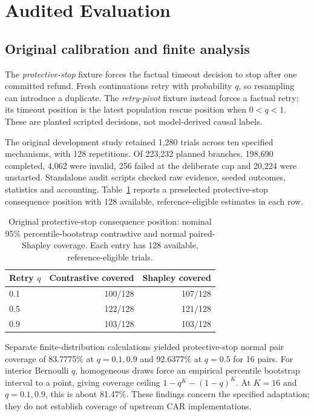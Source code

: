 \documentclass[conference]{IEEEtran}
\begin{document}
\section{Audited Evaluation}
\subsection{Original calibration and finite analysis}
The \emph{protective-stop} fixture forces the factual timeout decision to stop
after one committed refund. Fresh continuations retry with probability $q$,
so resampling can introduce a duplicate. The \emph{retry-pivot} fixture instead
forces a factual retry; its timeout position is the latest population rescue
position when $0<q<1$. These are planted scripted decisions, not model-derived
causal labels.

The original development study retained 1,280 trials across ten specified
mechanisms, with 128 repetitions. Of 223,232 planned branches, 198,690
completed, 4,062 were invalid, 256 failed at the deliberate cap and 20,224
were unstarted. Standalone audit scripts checked raw evidence, seeded outcomes,
statistics and accounting. Table~\ref{tab:original} reports a preselected
protective-stop consequence position with 128 available, reference-eligible
estimates in each row.

\begin{table}[t]
\caption{Original protective-stop consequence position: nominal 95\%
percentile-bootstrap contrastive and normal paired-Shapley coverage.
Each entry has 128 available, reference-eligible trials.}
\label{tab:original}
\centering
\begin{tabular}{lrr}
\toprule
Retry $q$ & Contrastive covered & Shapley covered\\
\midrule
0.1 & 100/128 & 107/128\\
0.5 & 122/128 & 121/128\\
0.9 & 103/128 & 103/128\\
\bottomrule
\end{tabular}
\end{table}

Separate finite-distribution calculations yielded protective-stop normal pair
coverage of 83.7775\% at $q=0.1,0.9$ and 92.6377\% at $q=0.5$ for 16 pairs.
For interior Bernoulli $q$, homogeneous draws force an empirical percentile
bootstrap interval to a point, giving coverage ceiling
$1-q^K-(1-q)^K$. At $K=16$ and $q=0.1,0.9$, this is about 81.47\%.
These findings concern the specified adaptation; they do not establish
coverage of upstream CAR implementations.
\end{document}
